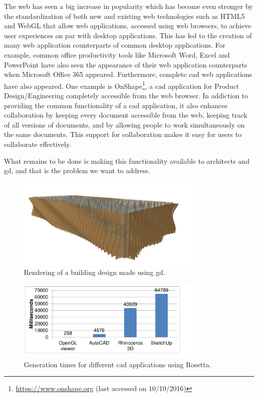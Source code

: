 The web has seen a big increase in popularity which has become even stronger by the standardization of both new and existing web technologies such as HTML5\cite{hickson2011html5} and WebGL\cite{marrin2011webgl} that allow web applications, accessed using web browsers, to achieve user experiences on par with desktop applications.
This has led to the creation of many web application counterparts of common desktop applications.
For example, common office productivity tools like Microsoft Word, Excel and PowerPoint have also seen the appearance of their web application counterparts when Microsoft Office 365 appeared.
Furthermore, complete \gls{cad} web applications have also appeared.
One example is OnShape\footnote{\url{https://www.onshape.org} (last accessed on 10/10/2016)}, a \gls{cad} application for Product Design/Engineering completely accessible from the web browser.
In addiction to providing the common functionality of a \gls{cad} application, it also enhances collaboration by keeping every document accessible from the web, keeping track of all versions of documents, and by allowing people to work simultaneously on the same documents.
This support for collaboration makes it easy for users to collaborate effectively.

What remains to be done is making this functionality available to architects and \gls{gd}, and that is the problem we want to address.

\begin{figure}
	\centering
	\includegraphics[width=0.8\textwidth]{images/carmo_render}
	\caption{Rendering of a building design made using \gls{gd}.}
	\label{fig:carmo:render}
\end{figure}

\begin{figure}
	\centering
	\includegraphics[width=0.8\textwidth]{images/carmo_rosetta_times}
	\caption{Generation times for different \gls{cad} applications using Rosetta.}
	\label{fig:carmo:times}
\end{figure}



